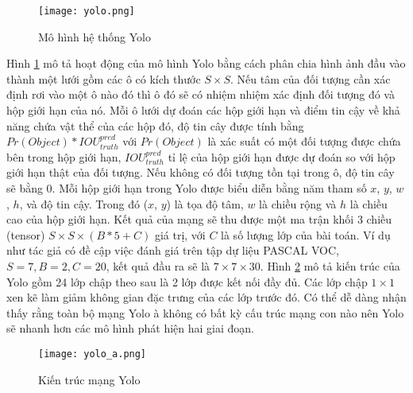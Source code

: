 \documentclass[../the.tex]{subfiles}
\begin{document}
\begin{figure}[H]
	\centering
	\texttt{[image: yolo.png]}
	\caption{Mô hình hệ thống Yolo}
	\label{fig:yolo}
\end{figure}
\bigskip


{\fontsize{13}{12} \selectfont 
Hình \ref{fig:yolo} mô tả hoạt động của mô hình Yolo bằng cách phân chia hình ảnh đầu vào thành một lưới gồm các ô có kích thước
$S \times S$. Nếu tâm của đối tượng cần xác định rơi vào một ô nào đó thì ô đó sẽ có nhiệm nhiệm xác định đối tượng đó và hộp giới hạn của nó.
Mỗi ô lưới dự đoán các hộp giới hạn và điểm tin cậy về khả năng chứa vật thể của các hộp đó, độ tin cây được tính bằng $Pr(Object) * IOU^{pred}_{truth}$ \cite{redmon2016look}
với $Pr(Object)$ là xác suất có một đối tượng được chứa bên trong hộp giới hạn, $IOU^{pred}_{truth}$ tỉ lệ của hộp giới hạn được dự đoán so với hộp giới hạn thật của đối tượng.
Nếu không có đối tượng tồn tại trong ô, độ tin cây sẽ bằng 0. Mỗi hộp giới hạn trong Yolo được biểu diễn bằng năm tham số 
$x$, $y$, $w$, $h$, và độ tin cậy. Trong đó ($x$, $y$) là tọa độ tâm, $w$ là chiều rộng và $h$ là chiều cao của hộp giới hạn.
Kết quả của mạng sẽ thu được một ma trận khối 3 chiều (tensor)  $S \times S \times (B * 5 + C)$ giá trị, với 
$C$ là số lượng lớp của bài toán. Ví dụ như tác giả có đề cập việc đánh giá trên tập dự liệu PASCAL VOC, $S = 7, B = 2, C = 20$, kết quả đầu ra sẽ là $7 \times 7 \times 30$. 
Hình \ref{fig:mangyolo} mô tả kiến trúc của Yolo gồm 24 lớp chập theo sau là 2 lớp được kết nối đầy đủ. Các lớp chập $1 \times 1$ xen kẽ làm giảm không gian đặc trưng của các lớp trước đó.
Có thể dễ dàng nhận thấy rằng toàn bộ mạng Yolo à không có bất kỳ cấu trúc mạng con nào nên Yolo sẽ nhanh hơn các mô hình phát hiện hai giai đoạn.
}

\begin{figure}[H]
	\centering
	\texttt{[image: yolo\_a.png]}
	\caption{Kiến trúc mạng Yolo}
	\label{fig:mangyolo}
\end{figure}
\bigskip
\end{document}
